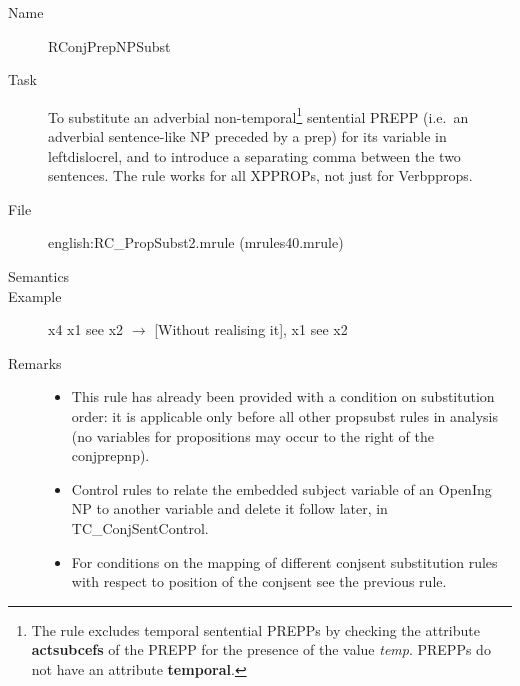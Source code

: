 \begin{description}
\vspace{1 cm}
\begin{description}
\item[Name] RConjPrepNPSubst
\item[Task] To substitute an adverbial non-temporal\footnote
{The rule excludes temporal sentential PREPPs by checking the attribute {\bf 
actsubcefs} of the PREPP for the presence of the value {\em temp\/}. PREPPs do 
not have an attribute {\bf temporal}.} sentential PREPP (i.e.\ an adverbial
sentence-like NP preceded by a prep) for its variable in 
leftdislocrel, and to introduce a separating comma between the two sentences.
The rule works for all XPPROPs, not just for Verbpprops.
\item[File] english:RC\_PropSubst2.mrule (mrules40.mrule)
\item[Semantics]
\item[Example] x4 x1 see x2 $\rightarrow$ [Without realising it], x1 see x2
\item[Remarks] \mbox{}
\begin{itemize}
\item This rule has already been provided with a condition on substitution 
order: it is applicable only before all other propsubst rules in analysis 
(no variables for propositions may occur to the right of the conjprepnp).
\item Control rules to relate the embedded subject variable of an OpenIng NP 
to another variable and delete it follow later, in TC\_ConjSentControl.
\item For conditions on the mapping of different conjsent substitution rules 
with respect to position of the conjsent see the previous rule.
\end{itemize}
\end{description}


\end{description}
